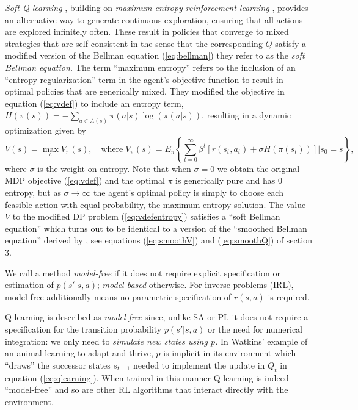{\it Soft-Q learning\/} \citep{softqlearning:2017}, building on {\it maximum entropy reinforcement learning\/} \citep{ziebart:2008},
provides an alternative way to generate continuous exploration, ensuring that all actions are
explored infinitely often. These result in policies that converge to mixed strategies that are self-consistent in the 
sense that the corresponding $Q$ satisfy a modified version of the Bellman equation 
(\ref{eq:bellman}) they refer to as the {\it soft Bellman equation.\/} The term ``maximum entropy'' refers to the
inclusion of an ``entropy regularization'' term in the agent's objective function to result in optimal policies
that are generically  mixed. They modified the objective in equation (\ref{eq:vdef}) 
to include an entropy term, $H(\pi(s))=-\sum_{a \in A(s)}\pi(a|s)\log(\pi(a|s))$, resulting in
a dynamic optimization given by
\begin{equation}
       V(s)= \max_\pi  V_\pi(s),  \quad \mbox{where} \;  V_\pi(s) = E_\pi \left\{\sum_{t=0}^\infty \beta^t[r(s_t,a_t)+\sigma H(\pi(s_t))]| s_0=s\right\},
\label{eq:vdefentropy}
\end{equation}
where $\sigma$ is the weight on entropy. Note that when $\sigma=0$ we obtain the original MDP objective
(\ref{eq:vdef}) and the optimal $\pi$ is generically pure and has 0 entropy,
but as $\sigma \to \infty$ the agent's optimal policy is simply to choose each feasible action with
equal probability, the maximum entropy solution.  The value $V$ to the modified DP problem
(\ref{eq:vdefentropy}) satisfies a ``soft Bellman equation'' which  turns out to be identical
to a version of the ``smoothed Bellman equation'' derived by \citet{rust:1988}, 
see equations  (\ref{eq:smoothV}) and (\ref{eq:smoothQ}) of section 3.

We call a method \textit{model-free} if it does not require explicit specification or estimation of $p(s'|s,a)$; \textit{model-based} otherwise. For inverse problems (IRL), model-free additionally means no parametric specification of $r(s,a)$ is required.

Q-learning  is described as {\it model-free\/} since, unlike SA or PI, it does not require a specification for the
transition probability $p(s'|s,a)$ or the need for numerical integration: we only need to {\it simulate new states using $p$.\/} In  Watkins'  example
of an animal learning to adapt and thrive, $p$ is implicit in its environment which ``draws'' the successor states
$s_{t+1}$ needed to implement the update in $Q_t$ in equation (\ref{eq:qlearning}). When trained in this manner Q-learning is indeed ``model-free''
and so are other RL algorithms that interact directly with the environment.

